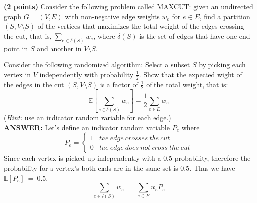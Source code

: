 \documentclass{article}
\begin{document}
\medskip 

\textbf{(2 points)}
Consider the following problem called MAXCUT: given an undirected
graph $G=(V,E)$ with non-negative edge weights $w_e$ for $e\in E$,
find a partition $(S,V\setminus S)$ of the vertices that maximizes the
total weight of the edges crossing the cut, that is,
$\sum_{e\in\delta(S)}w_{e}$, where $\delta(S)$ is the set of edges
that have one end-point in $S$ and another in $V\setminus S$.     

Consider the following randomized algorithm: Select a subset $S$ by
picking each vertex in $V$ independently with probability
$\frac{1}{2}$. Show that the expected wight of the edges in the cut
$(S,V\setminus S)$ is a factor of $\frac{1}{2}$ of the total weight,
that is: $$\mathbb{E}\left[\sum_{e\in\delta(S)}w_{e}\right]=
\frac{1}{2}\sum_{e\in E}w_e$$ ({\it Hint:} use an indicator random
variable for each edge.)\\  
\noindent \underline{\textbf{ANSWER:}}
Let's define an indicator random variable $P_{e}$ where
\begin{equation}
  \label{eq:indicator-random-variable}
  P_{e} = 
  \begin{cases}
    1 & the~edge~crosses~the~cut\\
    0 & the~edge~does~not~cross~the~cut
  \end{cases}
\end{equation}
Since each vertex is picked up independently with a $0.5$ probability,
therefore the probability for a vertex's both ends are in the same set
is $0.5$. Thus we have $\mathbb{E}[P_{e}]~=~0.5$.
$$\sum_{e\in\delta(S)}w_{e}~=~\sum_{e\in E}w_{e}P_{e}$$
 
\medskip
\end{document}
